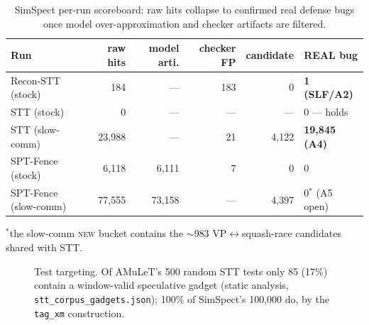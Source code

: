 \documentclass[11pt]{article}
\begin{document}
\begin{table}[p]\centering\small
\renewcommand{\arraystretch}{1.2}
\caption{SimSpect per-run scoreboard: raw hits collapse to confirmed real defense
bugs once model over-approximation and checker artifacts are filtered.}
\label{tab:score}
\begin{tabular}{@{}lrrrrl@{}}
\toprule
\textbf{Run} & \textbf{raw hits} & \textbf{model arti.} & \textbf{checker FP} & \textbf{candidate} & \textbf{REAL bug}\\
\midrule
Recon-STT (stock)        & 184    & ---    & 183  & 0     & \textcolor{ctarget}{\textbf{1 (SLF/A2)}}\\
STT (stock)              & 0      & ---    & ---  & ---   & 0 --- holds\\
STT (slow-comm)          & 23{,}988 & ---  & 21   & 4{,}122 & \textcolor{ctarget}{\textbf{19{,}845 (A4)}}\\
SPT-Fence (stock)        & 6{,}118 & 6{,}111 & 7   & 0     & 0\\
SPT-Fence (slow-comm)    & 77{,}555 & 73{,}158 & --- & 4{,}397 & 0$^{*}$ (A5 open)\\
\bottomrule
\end{tabular}

\vspace{1pt}\footnotesize $^{*}$the slow-comm \textsc{new} bucket contains the
$\sim$983 VP$\leftrightarrow$squash-race candidates shared with STT.
\end{table}


\begin{figure}[p]\centering
{}
\caption{Test targeting. Of AMuLeT's 500 random STT tests only 85 (17\%) contain a
window-valid speculative gadget (static analysis, \texttt{stt\_corpus\_gadgets.json});
100\% of SimSpect's 100{,}000 do, by the \texttt{tag\_xm} construction.}
\label{fig:target}
\end{figure}
\end{document}

